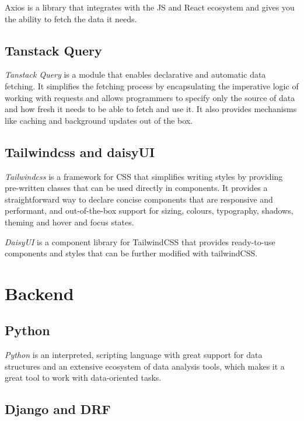 Axios is a library that integrates with the JS and React ecosystem and gives you the ability to fetch the data it needs. \cite{axios}

\subsection{Tanstack Query}

\emph{Tanstack Query} is a module that enables declarative and automatic data fetching. It simplifies the fetching process by encapsulating the imperative logic of working with requests and allows programmers to specify only the source of data and how fresh it needs to be able to fetch and use it. It also provides mechanisms like caching and background updates out of the box. \cite{tanstack_query}

\subsection{Tailwindcss and daisyUI}

\emph{Tailwindcss} is a framework for CSS that simplifies writing styles by providing pre-written classes that can be used directly in components. It provides a straightforward way to declare concise components that are responsive and performant, and out-of-the-box support for sizing, colours, typography, shadows, theming and hover and focus states. \cite{tailwind}

\emph{DaisyUI} is a component library for TailwindCSS that provides ready-to-use components and styles that can be further modified with tailwindCSS. \cite{daisyUI}

\section{Backend}

\subsection{Python}

\emph{Python} is an interpreted, scripting language with great support for data structures and an extensive ecosystem of data analysis tools, which makes it a great tool to work with data-oriented tasks. \cite{python}

\subsection{Django and DRF}

